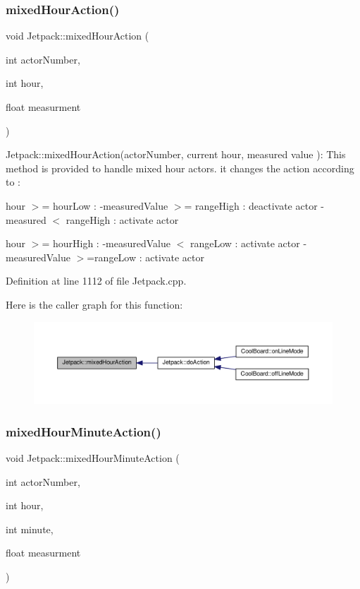 \subsubsection{\texorpdfstring{mixed\+Hour\+Action()}{mixedHourAction()}}
{\footnotesize\ttfamily void Jetpack\+::mixed\+Hour\+Action (\begin{DoxyParamCaption}\item[{int}]{actor\+Number,  }\item[{int}]{hour,  }\item[{float}]{measurment }\end{DoxyParamCaption})}

Jetpack\+::mixed\+Hour\+Action(actor\+Number, current hour, measured value )\+: This method is provided to handle mixed hour actors. it changes the action according to \+:

hour $>$= hour\+Low \+: -\/measured\+Value $>$= range\+High \+: deactivate actor -\/measured $<$ range\+High \+: activate actor

hour $>$= hour\+High \+: -\/measured\+Value $<$ range\+Low \+: activate actor -\/measured\+Value $>$=range\+Low \+: activate actor 

Definition at line 1112 of file Jetpack.\+cpp.

Here is the caller graph for this function\+:\nopagebreak
\begin{figure}[H]
\begin{center}
\leavevmode
\includegraphics[width=350pt]{class_jetpack_ac1a49ab4867718cdb415ad74c2066b9d_icgraph}
\end{center}
\end{figure}
\mbox{\label{class_jetpack_a273dae1517b56f0242e28b8944edc26b}} 
\subsubsection{\texorpdfstring{mixed\+Hour\+Minute\+Action()}{mixedHourMinuteAction()}}
{\footnotesize\ttfamily void Jetpack\+::mixed\+Hour\+Minute\+Action (\begin{DoxyParamCaption}\item[{int}]{actor\+Number,  }\item[{int}]{hour,  }\item[{int}]{minute,  }\item[{float}]{measurment }\end{DoxyParamCaption})}

